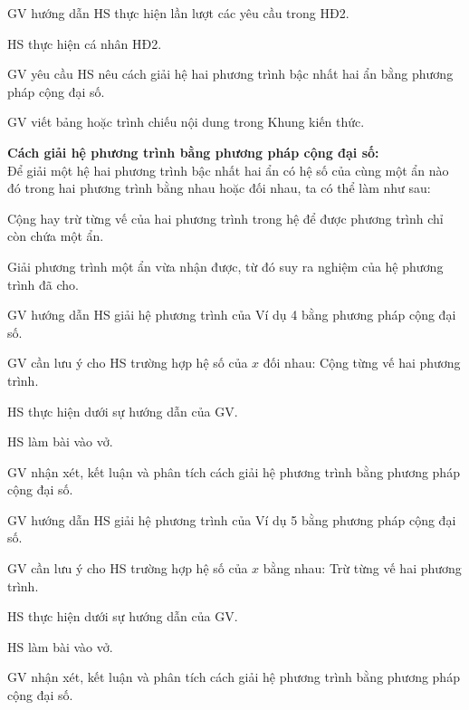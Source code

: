 \tochucthuchien

\begin{tcth}[ttkp]
    \buocmot
    \item GV hướng dẫn HS thực hiện lần lượt các yêu cầu trong HĐ2.
    \buochai
    \item HS thực hiện cá nhân HĐ2.
    \buocba
    \item GV yêu cầu HS nêu cách giải hệ hai phương trình bậc nhất hai ẩn bằng phương pháp cộng đại số.
    \buocbon
    \item GV viết bảng hoặc trình chiếu nội dung trong Khung kiến thức.
    \begin{kttt}
        \textbf{Cách giải hệ phương trình bằng phương pháp cộng đại số:}\\
        Để giải một hệ hai phương trình bậc nhất hai ẩn có hệ số của cùng một ẩn nào đó trong hai phương trình bằng nhau hoặc đối nhau, ta có thể làm như sau:
        \begin{cacbuoc}
            \item Cộng hay trừ từng vế của hai phương trình trong hệ để được phương trình chỉ còn chứa một ẩn.
            \item Giải phương trình một ẩn vừa nhận được, từ đó suy ra nghiệm của hệ phương trình đã cho.
        \end{cacbuoc}
    \end{kttt}
\end{tcth}

\begin{tcth}[vidu=4]
    \buocmot
    \item GV hướng dẫn HS giải hệ phương trình của Ví dụ 4 bằng phương pháp cộng đại số.
    \item GV cần lưu ý cho HS trường hợp hệ số của $x$ đối nhau: Cộng từng vế hai phương trình.
    \buochai
    \item HS thực hiện dưới sự hướng dẫn của GV. 
    \buocba
    \item HS làm bài vào vở.
    \buocbon
    \item GV nhận xét, kết luận và phân tích cách giải hệ phương trình bằng phương pháp cộng đại số.
\end{tcth}

\begin{tcth}[vidu=5]
    \buocmot
    \item GV hướng dẫn HS giải hệ phương trình của Ví dụ 5 bằng phương pháp cộng đại số.
    \item GV cần lưu ý cho HS trường hợp hệ số của $x$ bằng nhau: Trừ từng vế hai phương trình.
    \buochai
    \item HS thực hiện dưới sự hướng dẫn của GV. 
    \buocba
    \item HS làm bài vào vở.
    \buocbon
    \item GV nhận xét, kết luận và phân tích cách giải hệ phương trình bằng phương pháp cộng đại số.
\end{tcth}


